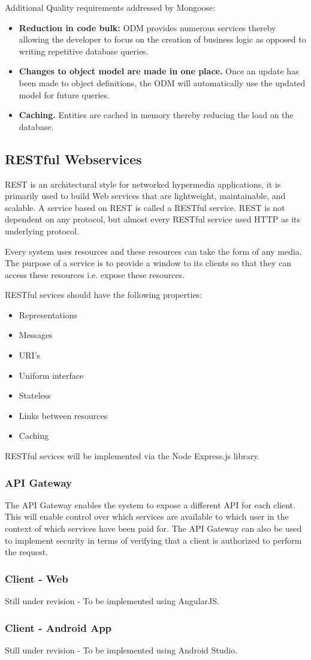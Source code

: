 \documentclass[a4paper,12pt]{article}
\begin{document}
	{\noindent}Additional Quality requirements addressed by Mongoose:
	\begin{itemize}
		\item \textbf{Reduction in code bulk:} ODM provides numerous services thereby allowing the developer to focus on the creation of business logic as opposed to writing repetitive database queries. 
		\item \textbf{Changes to object model are made in one place.} Once an update has been made to object definitions, the ODM will automatically use the updated model for future queries. 
		\item \textbf{Caching.} Entities are cached in memory thereby reducing the load on the database. 
	\end{itemize}
	
	\newpage
	\subsection{RESTful Webservices}
	REST is an architectural style for networked hypermedia applications, it is primarily used to build Web services that are lightweight, maintainable, and scalable. A service based on REST is called a RESTful service. REST is not dependent on any protocol, but almost every RESTful service used HTTP as its underlying protocol.
	
	\noindent Every system uses resources and these resources can take the form of any media. The purpose of a service is to provide a window to its clients so that they can access these resources i.e. expose these resources.
	
	\noindent RESTful sevices should have the following properties:
	
	\begin{itemize}
		\item Representations
		\item Messages
		\item URI's
		\item Uniform interface
		\item Stateless
		\item Links between resources
		\item Caching
	\end{itemize}
	
	\noindent RESTful sevices will be implemented via the Node Express.js library.
	
	\subsubsection{API Gateway}
	The API Gateway enables the system to expose a different API for each client. This will enable control over which services are available to which user in the context of which services have been paid for. The API Gateway can also be used to implement security in terms of verifying that a client is authorized to perform the request.
	
	\subsubsection{Client - Web}
	Still under revision - To be implemented using AngularJS.
	\subsubsection{{Client - Android App}}
	Still under revision - To be implemented using Android Studio.
\end{document}
